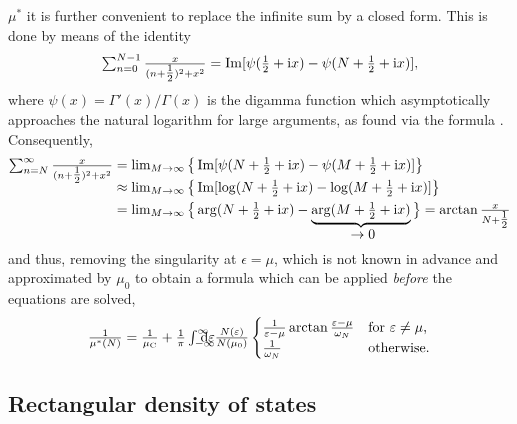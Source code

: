 $\mu^*$ it is further convenient to replace the infinite sum by a closed form.
This is done by means of the identity \cite[Eq.~A.14]{AllenMitrovic82}
%
\begin{equation*}
    \sum_{n = 0}^{N - 1} \frac x {(n + \tfrac 1 2)^2 + x^2}
    = \Im[\psi(\tfrac 1 2 + \I x) - \psi(N + \tfrac 1 2 + \I x)],
\end{equation*}
%
where $\psi(x) = \varGamma'(x) / \varGamma(x)$ is the digamma function which
asymptotically approaches the natural logarithm for large arguments, as found
via the  formula \cite[Appendix~A]{AllenMitrovic82}.
Consequently,
%
\begin{align*}
    \smash[b]{\sum_{n = N}^\infty \frac x {(n + \tfrac 1 2)^2 + x^2}}
    &= \lim_{M \rightarrow \infty}
    \big\{
        \Im[\psi(N + \tfrac 1 2 + \I x) - \psi(M + \tfrac 1 2 + \I x)]
    \big\}
    \\
    &\approx \lim_{M \rightarrow \infty}
    \big\{
        \Im[\log(N + \tfrac 1 2 + \I x) - \log(M + \tfrac 1 2 + \I x)]
    \big\}
    \\
    &= \lim_{M \rightarrow \infty}
    \big\{
        \arg(N + \tfrac 1 2 + \I x)
        - \hypo{\arg(M + \tfrac 1 2 + \I x)}{\rightarrow 0}
    \big\}
    = \smash{\arctan \frac x {N + \tfrac 1 2}}
\end{align*}
%
and thus, removing the singularity at $\epsilon = \mu$, which is not known in
advance and approximated by $\mu_0$ to obtain a formula which can be applied
\emph{before} the  equations are solved,
%
\begin{equation} \label{rescaled Coulomb pseudo-potential}
    \frac 1 {\mu^*(N)} = \frac 1 {\mu \sub C}
    + \frac 1 \pi \int \from{-\infty} \till \infty \D \epsilon
    \frac{N(\epsilon)}{N(\mu_0)}
    \begin{cases}
        \frac 1 {\epsilon - \mu} \arctan \frac{\epsilon - \mu}{\omega_N}
            & \text{for $\epsilon \neq \mu$,} \\
        \frac 1 {\omega_N}
            & \text{otherwise.}
    \end{cases}
\end{equation}

\subsection{Rectangular density of states}
\label{rectangular density of states}

